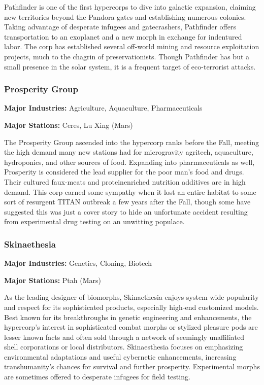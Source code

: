 Pathfinder is one of the first hypercorps to dive into galactic
expansion, claiming new territories beyond the Pandora gates and
establishing numerous colonies.  Taking advantage of desperate
infugees and gatecrashers, Pathfinder offers transportation to an
exoplanet and a new morph in exchange for indentured labor.  The corp
has established several off-world mining and resource exploitation
projects, much to the chagrin of preservationists. Though Pathfinder
has but a small presence in the solar system, it is a frequent target
of eco-terrorist attacks.

\subsubsection{Prosperity Group}
\label{sec:prosperity-group}

\textbf{Major Industries:} Agriculture, Aquaculture, Pharmaceuticals

\textbf{Major Stations:} Ceres, Lu Xing (Mars)


The Prosperity Group ascended into the hypercorp ranks before the
Fall, meeting the high demand many new stations had for microgravity
agritech, aquaculture, hydroponics, and other sources of food.
Expanding into pharmaceuticals as well, Prosperity is considered the
lead supplier for the poor man's food and drugs. Their cultured
faux-meats and proteinenriched nutrition additives are in high
demand. This corp earned some sympathy when it lost an entire habitat
to some sort of resurgent TITAN outbreak a few years after the Fall,
though some have suggested this was just a cover story to hide an
unfortunate accident resulting from experimental drug testing on an
unwitting populace.

\subsubsection{Skinaethesia}
\label{sec:skinaethesia}

\textbf{Major Industries:} Genetics, Cloning, Biotech

\textbf{Major Stations:} Ptah (Mars)


As the leading designer of biomorphs, Skinaethesia enjoys system wide
popularity and respect for its sophisticated products, especially
high-end customized models. Best known for its breakthroughs in
genetic engineering and enhancements, the hypercorp's interest in
sophisticated combat morphs or stylized pleasure pods are lesser known
facts and often sold through a network of seemingly unaffiliated shell
corporations or local distributors. Skinaesthesia focuses on
emphasizing environmental adaptations and useful cybernetic
enhancements, increasing transhumanity's chances for survival and
further prosperity. Experimental morphs are sometimes offered to
desperate infugees for field testing.

